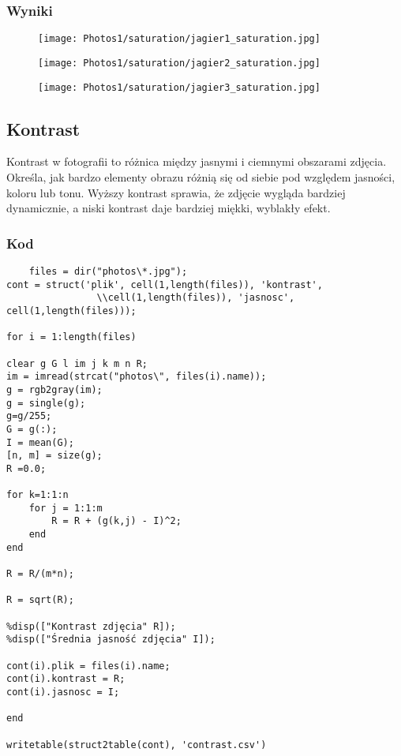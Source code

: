 \documentclass[]{mwart}
\begin{document}
\newpage
\subsubsection{Wyniki}


\begin{figure}[H]
    \centering
    \texttt{[image: Photos1/saturation/jagier1\_saturation.jpg]}

\end{figure}
\begin{figure}[H]
    \centering
    \texttt{[image: Photos1/saturation/jagier2\_saturation.jpg]}

\end{figure}
\begin{figure}[H]
    \centering
    \texttt{[image: Photos1/saturation/jagier3\_saturation.jpg]}

\end{figure}

\newpage



\newpage
\subsection{Kontrast}
Kontrast w fotografii to różnica między jasnymi i ciemnymi obszarami zdjęcia.
Określa, jak bardzo elementy obrazu różnią się od siebie pod względem
jasności, koloru lub tonu. Wyższy kontrast sprawia, że zdjęcie wygląda
bardziej dynamicznie, a niski kontrast daje bardziej miękki, wyblakły
efekt.

\subsubsection{Kod}
\begin{verbatim}
    files = dir("photos\*.jpg");
cont = struct('plik', cell(1,length(files)), 'kontrast',
                \\cell(1,length(files)), 'jasnosc', cell(1,length(files)));

for i = 1:length(files)

clear g G l im j k m n R;
im = imread(strcat("photos\", files(i).name)); 
g = rgb2gray(im);
g = single(g);
g=g/255;
G = g(:);
I = mean(G);
[n, m] = size(g);
R =0.0;

for k=1:1:n
    for j = 1:1:m
        R = R + (g(k,j) - I)^2;
    end
end

R = R/(m*n);

R = sqrt(R);

%disp(["Kontrast zdjęcia" R]);
%disp(["Średnia jasność zdjęcia" I]);

cont(i).plik = files(i).name;
cont(i).kontrast = R;
cont(i).jasnosc = I;

end

writetable(struct2table(cont), 'contrast.csv')

\end{verbatim}
\end{document}

